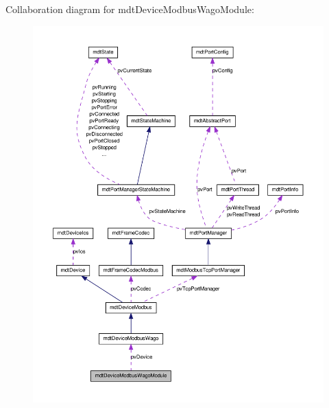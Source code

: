 Collaboration diagram for mdtDeviceModbusWagoModule:
\nopagebreak
\begin{figure}[H]
\begin{center}
\leavevmode
\includegraphics[width=400pt]{classmdt_device_modbus_wago_module__coll__graph}
\end{center}
\end{figure}
